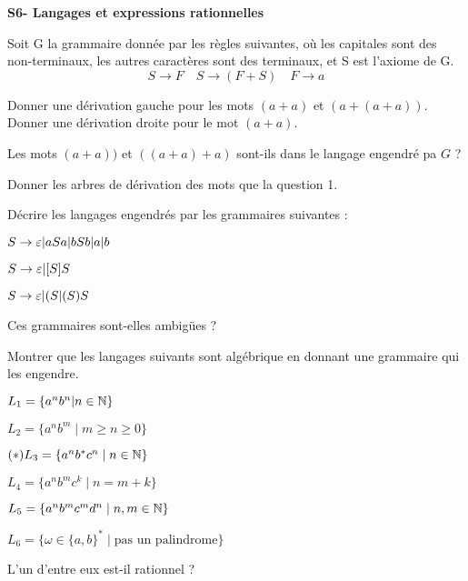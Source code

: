 \documentclass[french]{article}
\begin{document}
\begin{center}
    \huge{\textbf{S6- Langages et expressions rationnelles}}
\end{center}

\begin{exo}
    Soit G la grammaire donnée par les règles suivantes, où les capitales sont des
    non-terminaux, les autres caractères sont des terminaux, et S est l'axiome de G.
    \[S\to F\quad S\to(F+S)\quad F\to a\]
    \begin{q}{1}
        Donner une dérivation gauche pour les mots \((a+a)\) et \((a+(a+a))\).
        Donner une dérivation droite pour le mot \((a+a)\).
    \end{q}
    \begin{q}{2}
        Les mots \((a+a))\) et \(((a+a)+a)\) sont-ils dans le langage engendré pa
        \(G\) ?
    \end{q}
    \begin{q}{3}
        Donner les arbres de dérivation des mots que la question 1.
    \end{q}
\end{exo}

\begin{exo}
    Décrire les langages engendrés par les grammaires suivantes :
    \begin{q}{1}
        \(S\to\varepsilon|aSa|bSb|a|b\)
    \end{q}
    \begin{q}{2}
        \(S\to\varepsilon|[S]S\)
    \end{q}
    \begin{q}{3}
        \(S\to\varepsilon|(S| (S)S\)
    \end{q}
    Ces grammaires sont-elles ambigües ?
\end{exo}

\begin{exo}
    Montrer que les langages suivants sont algébrique en donnant une grammaire
    qui les engendre.
    \begin{q}{1}
        \(L_1=\{a^nb^n|n\in\mathbb{N}\}\)
    \end{q}
    \begin{q}{2}
        \(L_2=\{a^nb^m\mid m\geq n\geq 0\}\)
    \end{q}
    \begin{q}{3}
        \((*)L_3=\{a^nb^*c^n\mid n\in\mathbb{N}\}\)
    \end{q}
    \begin{q}{4}
        \(L_4=\{a^nb^mc^k\mid n=m+k\}\)
    \end{q}
    \begin{q}{5}
        \(L_5=\{a^nb^mc^md^n\mid n,m\in\mathbb{N}\}\)
    \end{q}
    \begin{q}{6}
        \(L_6=\{\omega\in\{a,b\}^*\mid \textrm{pas un palindrome}\}\)
    \end{q}
    L'un d'entre eux est-il rationnel ?
\end{exo}
\end{document}
